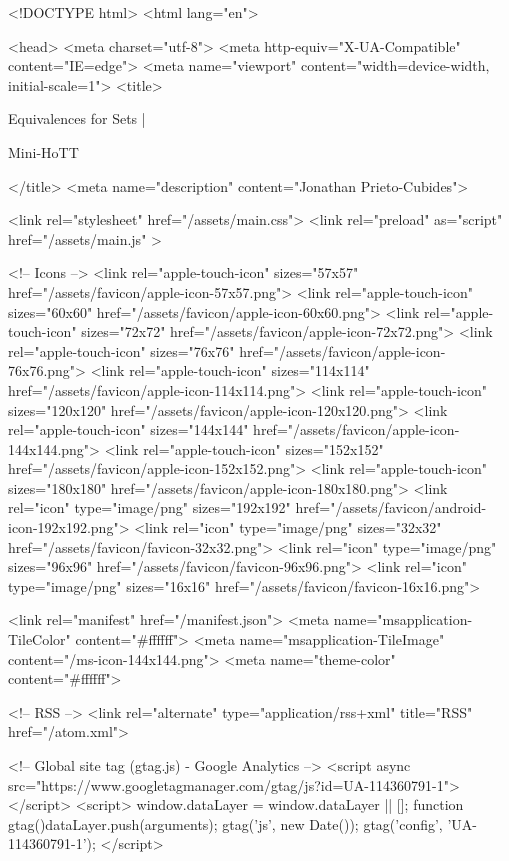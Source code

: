 <!DOCTYPE html>
<html lang="en">

<head>
  <meta charset="utf-8">
  <meta http-equiv="X-UA-Compatible" content="IE=edge">
  <meta name="viewport" content="width=device-width, initial-scale=1">
  <title>
    
      
        Equivalences for Sets |
      
        Mini-HoTT
    
  </title>
  <meta name="description" content="Jonathan Prieto-Cubides">

  <link rel="stylesheet" href="/assets/main.css">
  <link rel="preload" as="script" href="/assets/main.js" >

  <!-- Icons -->
  <link rel="apple-touch-icon" sizes="57x57" href="/assets/favicon/apple-icon-57x57.png">
  <link rel="apple-touch-icon" sizes="60x60" href="/assets/favicon/apple-icon-60x60.png">
  <link rel="apple-touch-icon" sizes="72x72" href="/assets/favicon/apple-icon-72x72.png">
  <link rel="apple-touch-icon" sizes="76x76" href="/assets/favicon/apple-icon-76x76.png">
  <link rel="apple-touch-icon" sizes="114x114" href="/assets/favicon/apple-icon-114x114.png">
  <link rel="apple-touch-icon" sizes="120x120" href="/assets/favicon/apple-icon-120x120.png">
  <link rel="apple-touch-icon" sizes="144x144" href="/assets/favicon/apple-icon-144x144.png">
  <link rel="apple-touch-icon" sizes="152x152" href="/assets/favicon/apple-icon-152x152.png">
  <link rel="apple-touch-icon" sizes="180x180" href="/assets/favicon/apple-icon-180x180.png">
  <link rel="icon" type="image/png" sizes="192x192"  href="/assets/favicon/android-icon-192x192.png">
  <link rel="icon" type="image/png" sizes="32x32" href="/assets/favicon/favicon-32x32.png">
  <link rel="icon" type="image/png" sizes="96x96" href="/assets/favicon/favicon-96x96.png">
  <link rel="icon" type="image/png" sizes="16x16" href="/assets/favicon/favicon-16x16.png">

  <link rel="manifest" href="/manifest.json">
  <meta name="msapplication-TileColor" content="#ffffff">
  <meta name="msapplication-TileImage" content="/ms-icon-144x144.png">
  <meta name="theme-color" content="#ffffff">

  <!-- RSS -->
  <link rel="alternate" type="application/rss+xml" title="RSS" href="/atom.xml">

  <!-- Global site tag (gtag.js) - Google Analytics -->
  <script async src="https://www.googletagmanager.com/gtag/js?id=UA-114360791-1"></script>
  <script>
    window.dataLayer = window.dataLayer || [];
    function gtag(){dataLayer.push(arguments);}
    gtag('js', new Date());
    gtag('config', 'UA-114360791-1');
  </script>

